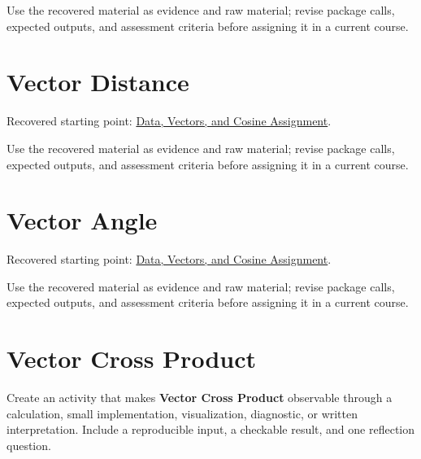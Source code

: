 \documentclass[
  letterpaper,
]{scrbook}
\begin{document}
Use the recovered material as evidence and raw material; revise package
calls, expected outputs, and assessment criteria before assigning it in
a current course.

\section*{Vector Distance}\label{sec-pr-03-vector-distance}


Recovered starting point:
\hyperref[sec-lab-data-initialization-assignment]{Data, Vectors, and
Cosine Assignment}.

Use the recovered material as evidence and raw material; revise package
calls, expected outputs, and assessment criteria before assigning it in
a current course.

\section*{Vector Angle}\label{sec-pr-03-vector-angle}


Recovered starting point:
\hyperref[sec-lab-data-initialization-assignment]{Data, Vectors, and
Cosine Assignment}.

Use the recovered material as evidence and raw material; revise package
calls, expected outputs, and assessment criteria before assigning it in
a current course.

\section*{Vector Cross Product}\label{sec-pr-03-vector-cross-product}


\begin{tcolorbox}[enhanced jigsaw, arc=.35mm, bottomrule=.15mm, bottomtitle=1mm, breakable, colback=white, colbacktitle=quarto-callout-note-color!10!white, colframe=quarto-callout-note-color-frame, coltitle=black, left=2mm, leftrule=.75mm, opacityback=0, opacitybacktitle=0.6, rightrule=.15mm, title=\textcolor{quarto-callout-note-color}{\faInfo}\hspace{0.5em}{Practice development scaffold}, titlerule=0mm, toprule=.15mm, toptitle=1mm]

Create an activity that makes \textbf{Vector Cross Product} observable
through a calculation, small implementation, visualization, diagnostic,
or written interpretation. Include a reproducible input, a checkable
result, and one reflection question.

\end{tcolorbox}
\end{document}
